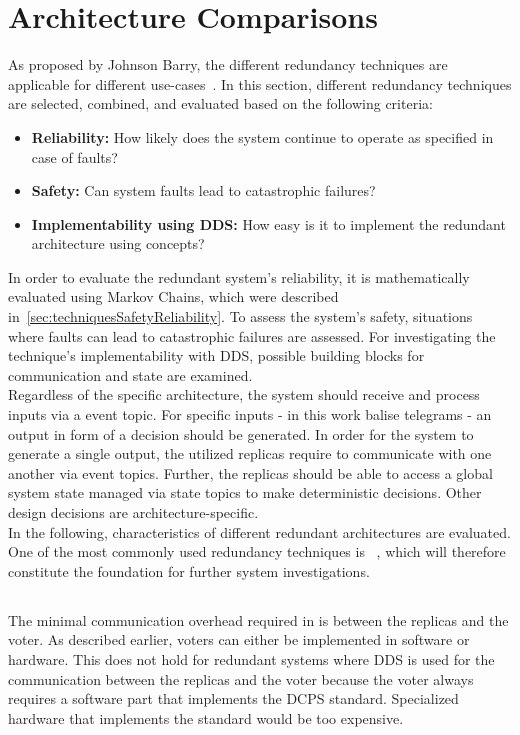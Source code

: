 \section{Architecture Comparisons}
As proposed by Johnson Barry, the different redundancy techniques are applicable for different use-cases~\cite{BarryFaultToleranceAnalysis}.
In this section, different redundancy techniques are selected, combined, and evaluated based on the following criteria:

\begin{itemize}
\item \textbf{Reliability:} How likely does the system continue to operate as specified in case of faults?
\item \textbf{Safety:} Can system faults lead to catastrophic failures?
\item \textbf{Implementability using \gls*{DDS}:} How easy is it to implement the redundant architecture using  concepts?
\end{itemize}

\noindent
In order to evaluate the redundant system's reliability, it is mathematically evaluated using Markov Chains, which were described in~\autoref{sec:techniquesSafetyReliability}.
To assess the system's safety, situations where faults can lead to catastrophic failures are assessed. 
For investigating the technique's implementability with \gls*{DDS}, possible  building blocks for communication and state are examined.
\\

\noindent
Regardless of the specific architecture, the system should receive and process inputs via a  event topic.
For specific inputs - in this work balise telegrams - an output in form of a decision should be generated.
In order for the system to generate a single output, the utilized replicas require to communicate with one another via  event topics.
Further, the replicas should be able to access a global system state managed via  state topics to make deterministic decisions.
Other design decisions are architecture-specific.
\\

\noindent
In the following, characteristics of different redundant architectures are evaluated.
One of the most commonly used redundancy techniques is ~\cite{FaultToleranceViaNMR}, which will therefore constitute the foundation for further system investigations.

\subsection{}
The minimal communication overhead required in  is between the replicas and the voter.
As described earlier, voters can either be implemented in software or hardware.
This does not hold for redundant systems where \gls*{DDS} is used for the communication between the replicas and the voter because the voter always requires a software part that implements the \gls*{DCPS} standard.
Specialized hardware that implements the  standard would be too expensive.
\\

